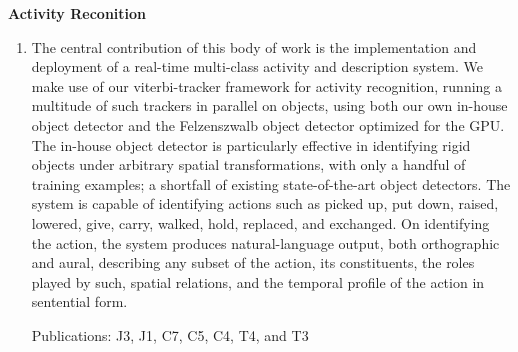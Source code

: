 \documentclass[10pt]{article}
\newenvironment{researchBlock}[1]{%
  \vspace*{0.5ex}
  {\large \textbf{#1}}
  \begin{enumerate}\item[]}
  {\end{enumerate}}
\newcommand{\refr}[1]{{\color{RoyalBlue} #1}}
\begin{document}
\begin{researchBlock} {Activity Reconition}
  The central contribution of this body of work is the implementation and
  deployment of a real-time multi-class activity and description system.
  We make use of our viterbi-tracker framework for activity recognition, running
  a multitude of such trackers in parallel on objects, using both our own
  in-house object detector and the Felzenszwalb object detector optimized for the
  GPU.
  The in-house object detector is particularly effective in identifying rigid
  objects under arbitrary spatial transformations, with only a handful of
  training examples; a shortfall of existing state-of-the-art object detectors.
  The system is capable of identifying actions such as picked up, put down,
  raised, lowered, give, carry, walked, hold, replaced, and exchanged.
  On identifying the action, the system produces natural-language output, both
  orthographic and aural, describing any subset of the action, its constituents,
  the roles played by such, spatial relations, and the temporal profile of the
  action in sentential form.

  Publications: \refr{J3}, \refr{J1}, \refr{C7}, \refr{C5}, \refr{C4},
  \refr{T4}, and \refr{T3}
\end{researchBlock}
\end{document}
